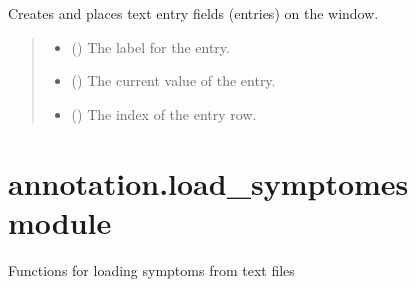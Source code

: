 \documentclass[letterpaper,10pt,english]{sphinxmanual}
\begin{document}
\begin{fulllineitems}
\begin{fulllineitems}
\end{fulllineitems}


\begin{fulllineitems}
\label{\detokenize{annotation:annotation.pop_up.SymptomeEditor.create_entry}}
\pysigstartsignatures
{}
\pysigstopsignatures
\sphinxAtStartPar
Creates and places text entry fields (entries) on the window.
\begin{quote}\begin{description}
\begin{itemize}
\item {} 
\sphinxAtStartPar
{} () \textendash{} The label for the entry.

\item {} 
\sphinxAtStartPar
{} () \textendash{} The current value of the entry.

\item {} 
\sphinxAtStartPar
{} () \textendash{} The index of the entry row.

\end{itemize}

\end{description}\end{quote}

\end{fulllineitems}


\end{fulllineitems}



\section{annotation.load\_symptomes module}
\label{\detokenize{annotation:module-annotation.load_symptomes}}\label{\detokenize{annotation:annotation-load-symptomes-module}}
\sphinxAtStartPar
Functions for loading symptoms from text files
\end{document}
